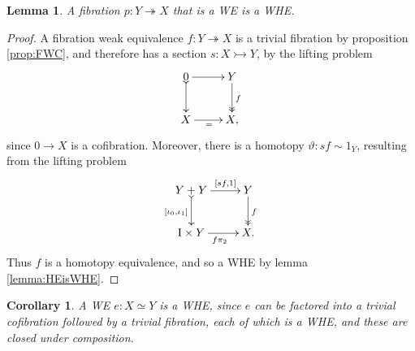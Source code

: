 \documentclass[12pt]{article}
\newcommand{\mono}{\ensuremath{\rightarrowtail}}
\newcommand{\ra}{\ensuremath{\rightarrow}}
\newcommand{\onto}{\ensuremath{\twoheadrightarrow}}
\newcommand{\I}{\ensuremath{\mathrm{I}}}
\newtheorem{lemma}[theorem]{Lemma}
\newtheorem{corollary}[theorem]{Corollary}
\theoremstyle{remark}
\theoremstyle{definition}
\begin{document}
\begin{lemma}\label{lemma:FibWEtoWHE}
A fibration $ p : Y \onto X$ that is a WE is a WHE.
\end{lemma}
\begin{proof}
A fibration weak equivalence $f : Y\onto X$ is a trivial fibration by proposition \ref{prop:FWC}, and therefore has a section $s: X\mono Y$, by the lifting problem
\begin{equation*}%
\xymatrix{
0 \ar@{>->}[d]_{} \ar[r] & Y \ar@{>>}[d]^{f} \\
X\ar[r]_{=} & X,
}
\end{equation*}
%
since $0\ra X$ is a cofibration. Moreover, there is a homotopy $\vartheta : sf \sim 1_Y$, resulting from the lifting problem
\begin{equation*}%
\xymatrix{
Y+Y \ar@{>->}[d]_{[\iota_0, \iota_1]} \ar[r]^-{[sf, 1]}  & Y\ar@{>>}[d]^{f} \\
\I\times Y \ar[r]_{f\pi_2} & X.
}
\end{equation*}
Thus $f$ is a homotopy equivalence, and so a WHE by lemma \ref{lemma:HEisWHE}.
\end{proof}

\begin{corollary}
A WE $e : X \simeq Y$ is a WHE, since $e$ can be factored into a trivial cofibration followed by a trivial fibration, each of which is a WHE, and these are closed under composition. 
\end{corollary}
\end{document}
